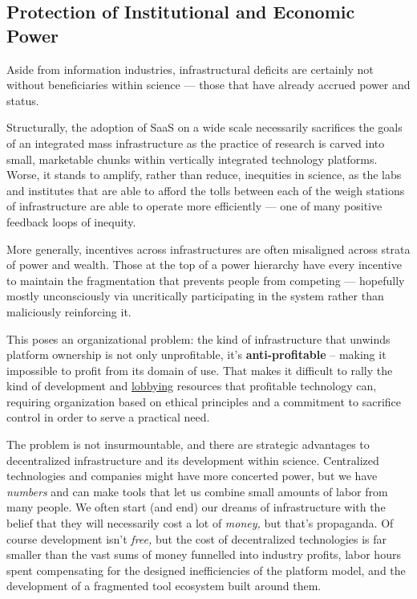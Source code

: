 \hypertarget{protection-of-institutional-and-economic-power}{%
\subsection{Protection of Institutional and Economic
Power}\label{protection-of-institutional-and-economic-power}}

Aside from information industries, infrastructural deficits are
certainly not without beneficiaries within science --- those that have
already accrued power and status.

Structurally, the adoption of SaaS on a wide scale necessarily
sacrifices the goals of an integrated mass infrastructure as the
practice of research is carved into small, marketable chunks within
vertically integrated technology platforms. Worse, it stands to amplify,
rather than reduce, inequities in science, as the labs and institutes
that are able to afford the tolls between each of the weigh stations of
infrastructure are able to operate more efficiently --- one of many
positive feedback loops of inequity.

More generally, incentives across infrastructures are often misaligned
across strata of power and wealth. Those at the top of a power hierarchy
have every incentive to maintain the fragmentation that prevents people
from competing --- hopefully mostly unconsciously via uncritically
participating in the system rather than maliciously reinforcing it.

This poses an organizational problem: the kind of infrastructure that
unwinds platform ownership is not only unprofitable, it's
\textbf{anti-profitable} -- making it impossible to profit from its
domain of use. That makes it difficult to rally the kind of development
and \href{https://www.snsi.info/}{lobbying} resources that profitable
technology can, requiring organization based on ethical principles and a
commitment to sacrifice control in order to serve a practical need.

The problem is not insurmountable, and there are strategic advantages to
decentralized infrastructure and its development within science.
Centralized technologies and companies might have more concerted power,
but we have \emph{numbers} and can make tools that let us combine small
amounts of labor from many people. We often start (and end) our dreams
of infrastructure with the belief that they will necessarily cost a lot
of \emph{money,} but that's propaganda. Of course development isn't
\emph{free,} but the cost of decentralized technologies is far smaller
than the vast sums of money funnelled into industry profits, labor hours
spent compensating for the designed inefficiencies of the platform
model, and the development of a fragmented tool ecosystem built around
them.

